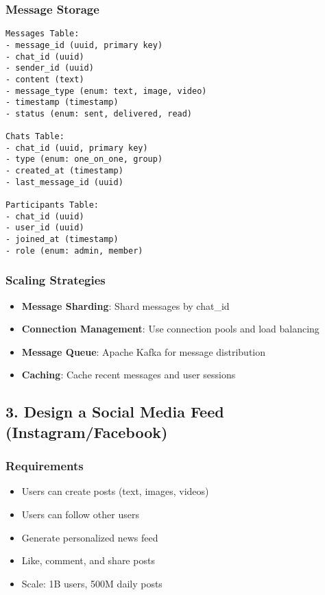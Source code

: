 \documentclass[10pt,a4paper]{article}
\begin{document}
\subsubsection{Message Storage}
\begin{verbatim}
Messages Table:
- message_id (uuid, primary key)
- chat_id (uuid)
- sender_id (uuid)
- content (text)
- message_type (enum: text, image, video)
- timestamp (timestamp)
- status (enum: sent, delivered, read)

Chats Table:
- chat_id (uuid, primary key)
- type (enum: one_on_one, group)
- created_at (timestamp)
- last_message_id (uuid)

Participants Table:
- chat_id (uuid)
- user_id (uuid)
- joined_at (timestamp)
- role (enum: admin, member)
\end{verbatim}

\subsubsection{Scaling Strategies}
\begin{itemize}
\item \textbf{Message Sharding}: Shard messages by chat\_id
\item \textbf{Connection Management}: Use connection pools and load balancing
\item \textbf{Message Queue}: Apache Kafka for message distribution
\item \textbf{Caching}: Cache recent messages and user sessions
\end{itemize}

\subsection{3. Design a Social Media Feed (Instagram/Facebook)}

\subsubsection{Requirements}
\begin{itemize}
\item Users can create posts (text, images, videos)
\item Users can follow other users
\item Generate personalized news feed
\item Like, comment, and share posts
\item Scale: 1B users, 500M daily posts
\end{itemize}
\end{document}
